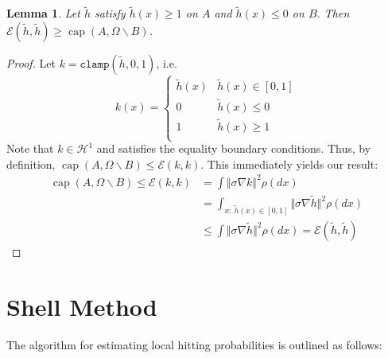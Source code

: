 \documentclass[nofootinbib,english, aip, jcp, priprint, graphicx,floatfix]{revtex4-1}
\newtheorem{lemma}{Lemma}
\theoremstyle{plain}
\theoremstyle{definition}
\theoremstyle{plain}
\newcommand{\capac}[2]{\ensuremath{\operatorname{cap}}(#1,#2)}
\begin{document}
\begin{lemma} \label{lem:inequalityboundaryvar} Let $\tilde h$ satisfy $\tilde h(x)\geq 1$ on $A$ and $\tilde h(x)\leq 0$ on $B$.  Then $\mathscr{E}(\tilde h,\tilde h) \geq \capac{A}{\Omega \backslash B}$.
\end{lemma}
\begin{proof}
Let $k=\mathtt{clamp}(\tilde h,0,1)$, i.e.
\[
k(x)=
\begin{cases}
\tilde h(x) & \tilde h(x)\in[0,1] \\
0 & \tilde h(x)\leq 0 \\
1 & \tilde h(x)\geq 1 \\
\end{cases}
\]  
Note that $k\in \mathcal{H}^1$ and satisfies the equality boundary conditions.  Thus, by definition, $\capac{A}{\Omega \backslash B} \leq \mathscr{E}(k,k)$.  This immediately yields our result:
\begin{align*}
\capac{A}{\Omega \backslash B} \leq \mathscr{E}(k,k) &= \int \Vert \sigma \nabla k \Vert^2 \rho(dx) \\
    &=\int_{x:\ \tilde h(x)\in[0,1]} \Vert \sigma \nabla \tilde h \Vert^2 \rho(dx) \\
    &\leq \int \Vert \sigma \nabla \tilde h \Vert^2 \rho(dx) = \mathscr{E}(\tilde h,\tilde h)
\end{align*}


\end{proof}

%
%
%
%
%
%
%
%
%






\section{Shell Method}
\label{sec:shell_method}

The algorithm for estimating local hitting probabilities is outlined as follows:
\end{document}
